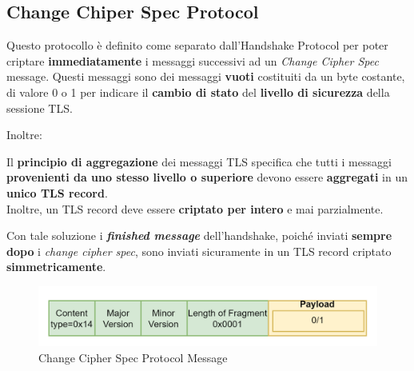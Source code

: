 \subsection{Change Chiper Spec Protocol}
\begin{definition}\label{def:changecipherprot}
Questo protocollo è definito come separato dall'Handshake Protocol per poter criptare \textbf{immediatamente} i messaggi successivi ad un \textit{Change Cipher Spec} message. Questi messaggi sono dei messaggi \textbf{vuoti} costituiti da un byte costante, di valore 0 o 1 per indicare il \textbf{cambio di stato} del \textbf{livello di sicurezza} della sessione TLS.
\end{definition} 
Inoltre:
\begin{theorem}
Il \textbf{principio di aggregazione} dei messaggi TLS specifica che tutti i messaggi \textbf{provenienti da uno stesso livello o superiore} devono essere \textbf{aggregati} in un \textbf{unico TLS record}.\\
Inoltre, un TLS record deve essere \textbf{criptato per intero} e mai parzialmente.
\end{theorem}
Con tale soluzione i \textbf{\textit{finished message}} dell'handshake, poiché inviati \textbf{sempre dopo} i \textit{change cipher spec}, sono inviati sicuramente in un TLS record criptato \textbf{simmetricamente}.
\begin{figure}[h]
    \centering
    \includegraphics{image/changecipher.png}
    \caption{Change Cipher Spec Protocol Message}
    \label{fig:changecipher}
\end{figure}\pagebreak

